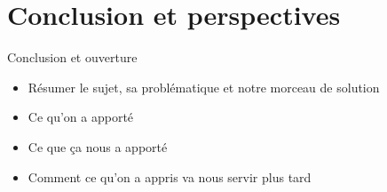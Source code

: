 \chapter*{Conclusion et perspectives}
\label{sec:conclusion}

    Conclusion et ouverture
    \begin{itemize}
    	\item Résumer le sujet, sa problématique et notre morceau de solution
    	\item Ce qu'on a apporté
    	\item Ce que ça nous a apporté
    	\item Comment ce qu'on a appris va nous servir plus tard
    \end{itemize}


